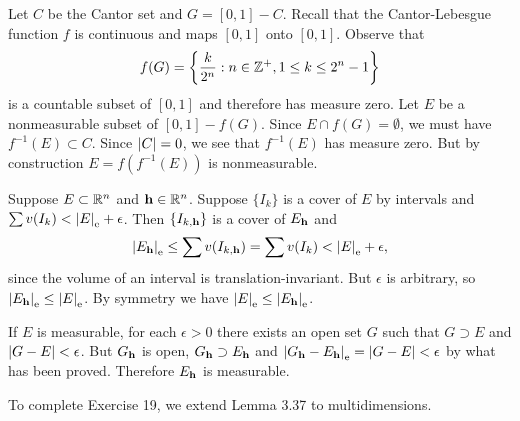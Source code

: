 \begin{exercise}{3.17}
  Let $C$ be the Cantor set and $G = [0, 1] - C$.
  Recall that the Cantor-Lebesgue function $f$ is continuous
  and maps $[0, 1]$ onto $[0, 1]$.
  Observe that
  \[
    f(G) = \left\{ \frac{k}{2^n} : n \in \mathbb{Z}^+, 1 \le k \le 2^n-1 \right\}
  \]
  is a countable subset of $[0, 1]$ and therefore has measure zero.
  Let $E$ be a nonmeasurable subset of $[0, 1] - f(G)$.
  Since $E \cap f(G) = \emptyset$,
  we must have $f^{-1}(E) \subset C$.
  Since $\left\vert C\right\vert = 0$,
  we see that $f^{-1}(E)$ has measure zero.
  But by construction $E = f (f^{-1}(E))$ is nonmeasurable.
\end{exercise}

\begin{exercise}{3.18}
  Suppose $E \subset \mathbb{R}^n$ and $\mathbf{h} \in \mathbb{R}^n$.
  Suppose $\{I_k\}$ is a cover of $E$ by intervals and
  $\sum v(I_k) < \left\vert E\right\vert_\mathrm{e} + \epsilon$.
  Then $\{I_{k, \mathbf{h}}\}$ is a cover of $E_{\mathbf{h}}$ and
  \[
    \left\vert E_{\mathbf{h}}\right\vert_\mathrm{e} \le \sum v(I_{k, \mathbf{h}}) = \sum v(I_k) < \left\vert E\right\vert_\mathrm{e} + \epsilon,
  \]
  since the volume of an interval is translation-invariant.
  But $\epsilon$ is arbitrary, so $\left\vert E_{\mathbf{h}}\right\vert_\mathrm{e} \le \left\vert E\right\vert_\mathrm{e}$.
  By symmetry we have $\left\vert E\right\vert_\mathrm{e} \le \left\vert E_{\mathbf{h}}\right\vert_\mathrm{e}$.

  If $E$ is measurable, for each $\epsilon > 0$
  there exists an open set $G$ such that $G \supset E$ and $\left\vert G-E\right\vert < \epsilon$.
  But $G_{\mathbf{h}}$ is open,
  $G_{\mathbf{h}} \supset E_{\mathbf{h}}$
  and $\left\vert G_{\mathbf{h}} - E_{\mathbf{h}}\right\vert_\mathrm{e} = \left\vert G - E\right\vert < \epsilon$
  by what has been proved.
  Therefore $E_{\mathbf{h}}$ is measurable.
\end{exercise}

To complete Exercise 19,
we extend Lemma 3.37 to multidimensions.

